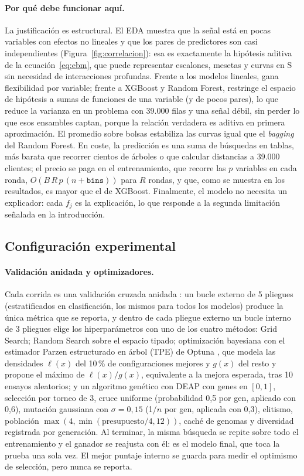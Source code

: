 \documentclass[pdflatex,sn-mathphys-num]{sn-jnl}
\begin{document}
\paragraph{Por qué debe funcionar aquí.}
La justificación es estructural. El EDA muestra que la señal está en pocas variables con efectos no lineales y que los pares de predictores son casi independientes (Figura~\ref{fig:correlacion}): esa es exactamente la hipótesis aditiva de la ecuación~\eqref{eq:ebm}, que puede representar escalones, mesetas y curvas en S sin necesidad de interacciones profundas. Frente a los modelos lineales, gana flexibilidad por variable; frente a XGBoost y Random Forest, restringe el espacio de hipótesis a sumas de funciones de una variable (y de pocos pares), lo que reduce la varianza en un problema con 39.000 filas y una señal débil, sin perder lo que esos ensambles captan, porque la relación verdadera es aditiva en primera aproximación. El promedio sobre bolsas estabiliza las curvas igual que el \textit{bagging} del Random Forest. En coste, la predicción es una suma de búsquedas en tablas, más barata que recorrer cientos de árboles o que calcular distancias a 39.000 clientes; el precio se paga en el entrenamiento, que recorre las $p$ variables en cada ronda, $O(B\,R\,p\,(n+\texttt{bins}))$ para $R$ rondas, y que, como se muestra en los resultados, es mayor que el de XGBoost. Finalmente, el modelo no necesita un explicador: cada $f_j$ es la explicación, lo que responde a la segunda limitación señalada en la introducción.

\subsection{Configuración experimental}\label{sec:config}

\paragraph{Validación anidada y optimizadores.}
Cada corrida es una validación cruzada anidada \cite{cawley2010overfitting}: un bucle externo de 5 pliegues (estratificados en clasificación, los mismos para todos los modelos) produce la única métrica que se reporta, y dentro de cada pliegue externo un bucle interno de 3 pliegues elige los hiperparámetros con uno de los cuatro métodos: Grid Search; Random Search sobre el espacio tipado; optimización bayesiana con el estimador Parzen estructurado en árbol (TPE) de Optuna \cite{akiba2019optuna}, que modela las densidades $\ell(x)$ del 10\,\% de configuraciones mejores y $g(x)$ del resto y propone el máximo de $\ell(x)/g(x)$, equivalente a la mejora esperada, tras 10 ensayos aleatorios; y un algoritmo genético con DEAP \cite{fortin2012deap} con genes en $[0,1]$, selección por torneo de 3, cruce uniforme (probabilidad 0,5 por gen, aplicado con 0,6), mutación gaussiana con $\sigma=0{,}15$ (1/$n$ por gen, aplicada con 0,3), elitismo, población $\max(4,\min(\text{presupuesto}/4,12))$, caché de genomas y diversidad registrada por generación. Al terminar, la misma búsqueda se repite sobre todo el entrenamiento y el ganador se reajusta con él: es el modelo final, que toca la prueba una sola vez. El mejor puntaje interno se guarda para medir el optimismo de selección, pero nunca se reporta.
\end{document}
